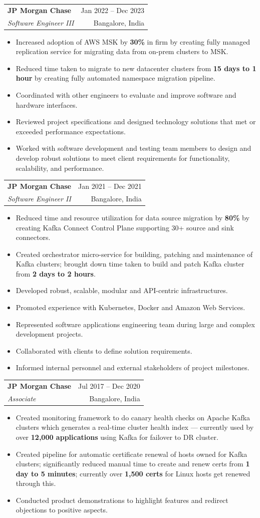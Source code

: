 \documentclass[letterpaper,11pt]{article}
\makeatletter
\newcommand{\resumeItem}[1]{
  \item\small{
    {#1 \vspace{-1pt}}
  }
}
\newcommand{\resumeSubheading}[4]{
  \vspace{-1pt}\item
    \begin{tabular*}{\textwidth}[t]{l@{\extracolsep{\fill}}r}
      \textbf{#1} & {\color{dark-grey}\small #2}\vspace{1pt}\\ %
      \textit{#3} & {\color{dark-grey} \small #4}\\ %
    \end{tabular*}\vspace{-4pt}
}
\newcommand{\resumeItemListStart}{\begin{itemize}}
\newcommand{\resumeItemListEnd}{\end{itemize}\vspace{0pt}}
\makeatother
\begin{document}
    \resumeSubheading
      {JP Morgan Chase}{Jan 2022 -- Dec 2023}
      {Software Engineer III}{Bangalore, India}
      \resumeItemListStart
        \resumeItem{Increased adoption of AWS MSK by \textbf{30\%} in firm by creating fully managed replication service for migrating data from on-prem clusters to MSK.}
        \resumeItem{Reduced time taken to migrate to new datacenter clusters from \textbf{15 days to 1 hour} by creating fully automated namespace migration pipeline.}
        \resumeItem{Coordinated with other engineers to evaluate and improve software and hardware interfaces.}
        \resumeItem{Reviewed project specifications and designed technology solutions that met or exceeded performance expectations.}
        \resumeItem{Worked with software development and testing team members to design and develop robust solutions to meet client requirements for functionality, scalability, and performance.}
      \resumeItemListEnd

    \resumeSubheading
      {JP Morgan Chase}{Jan 2021 -- Dec 2021}
      {Software Engineer II}{Bangalore, India}
      \resumeItemListStart
        \resumeItem{Reduced time and resource utilization for data source migration by \textbf{80\%} by creating Kafka Connect Control Plane supporting 30+ source and sink connectors.}
        \resumeItem{Created orchestrator micro-service for building, patching and maintenance of Kafka clusters; brought down time taken to build and patch Kafka cluster from \textbf{2 days to 2 hours}.}
        \resumeItem{Developed robust, scalable, modular and API-centric infrastructures.}
        \resumeItem{Promoted experience with Kubernetes, Docker and Amazon Web Services.}
        \resumeItem{Represented software applications engineering team during large and complex development projects.}
        \resumeItem{Collaborated with clients to define solution requirements.}
        \resumeItem{Informed internal personnel and external stakeholders of project milestones.}
      \resumeItemListEnd

    \resumeSubheading
      {JP Morgan Chase}{Jul 2017 -- Dec 2020}
      {Associate}{Bangalore, India}
      \resumeItemListStart
        \resumeItem{Created monitoring framework to do canary health checks on Apache Kafka clusters which generates a real-time cluster health index --- currently used by over \textbf{12,000 applications} using Kafka for failover to DR cluster.}
        \resumeItem{Created pipeline for automatic certificate renewal of hosts owned for Kafka clusters; significantly reduced manual time to create and renew certs from \textbf{1 day to 5 minutes}; currently over \textbf{1,500 certs} for Linux hosts get renewed through this.}
        \resumeItem{Conducted product demonstrations to highlight features and redirect objections to positive aspects.}
      \resumeItemListEnd
\end{document}
